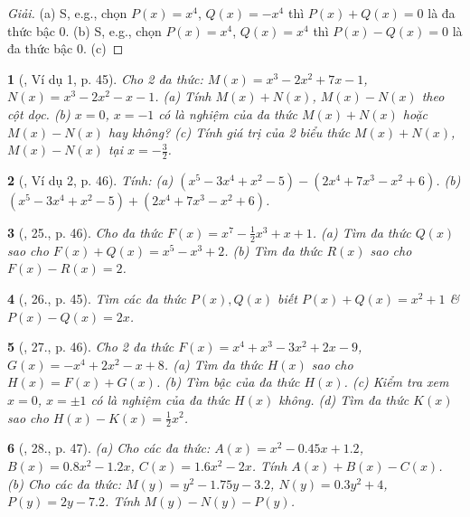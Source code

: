 \documentclass{article}
\newtheorem{baitoan}{}
\begin{document}
\begin{proof}[Giải]
	(a) S, e.g., chọn $P(x) = x^4$, $Q(x) = -x^4$ thì $P(x) + Q(x) = 0$ là đa thức bậc 0. (b) S, e.g., chọn $P(x) = x^4$, $Q(x) = x^4$ thì $P(x) - Q(x) = 0$ là đa thức bậc 0. (c)
\end{proof}

\begin{baitoan}[\cite{SBT_Toan_7_Canh_Dieu_tap_2}, Ví dụ 1, p. 45]
	Cho 2 đa thức: $M(x) =  x^3 - 2x^2 + 7x - 1$, $N(x) = x^3 - 2x^2 - x - 1$. (a) Tính $M(x) + N(x)$, $M(x) - N(x)$ theo cột dọc. (b) $x = 0$, $x = -1$ có là nghiệm của đa thức $M(x) + N(x)$ hoặc $M(x) - N(x)$ hay không? (c) Tính giá trị của 2 biểu thức $M(x) + N(x)$, $M(x) - N(x)$ tại $x = -\frac{3}{2}$.
\end{baitoan}

\begin{baitoan}[\cite{SBT_Toan_7_Canh_Dieu_tap_2}, Ví dụ 2, p. 46]
	Tính: (a) $(x^5 - 3x^4 + x^2 - 5) - (2x^4 + 7x^3 - x^2 + 6)$. (b) $(x^5 - 3x^4 + x^2 - 5) + (2x^4 + 7x^3 - x^2 + 6)$.
\end{baitoan}

\begin{baitoan}[\cite{SBT_Toan_7_Canh_Dieu_tap_2}, 25., p. 46]
	Cho đa thức $F(x) = x^7 - \frac{1}{2}x^3 + x + 1$. (a) Tìm đa thức $Q(x)$ sao cho $F(x) + Q(x) = x^5 - x^3 + 2$. (b) Tìm đa thức $R(x)$ sao cho $F(x) - R(x) = 2$.
\end{baitoan}

\begin{baitoan}[\cite{SBT_Toan_7_Canh_Dieu_tap_2}, 26., p. 45]
	Tìm các đa thức $P(x),Q(x)$ biết $P(x) + Q(x) = x^2 + 1$ \& $P(x) - Q(x) = 2x$.
\end{baitoan}

\begin{baitoan}[\cite{SBT_Toan_7_Canh_Dieu_tap_2}, 27., p. 46]
	Cho 2 đa thức $F(x) = x^4 + x^3 - 3x^2 + 2x - 9$, $G(x) = -x^4 + 2x^2 - x + 8$. (a) Tìm đa thức $H(x)$ sao cho $H(x) = F(x) + G(x)$. (b) Tìm bậc của đa thức $H(x)$. (c) Kiểm tra xem $x = 0$, $x = \pm1$ có là nghiệm của đa thức $H(x)$ không. (d) Tìm đa thức $K(x)$ sao cho $H(x) - K(x) = \frac{1}{2}x^2$.
\end{baitoan}

\begin{baitoan}[\cite{SBT_Toan_7_Canh_Dieu_tap_2}, 28., p. 47]
	(a) Cho các đa thức: $A(x) = x^2 - 0.45x + 1.2$, $B(x) = 0.8x^2 - 1.2x$, $C(x) = 1.6x^2 - 2x$. Tính $A(x) + B(x) - C(x)$. (b) Cho các đa thức: $M(y) = y^2 - 1.75y - 3.2$, $N(y) = 0.3y^2 + 4$, $P(y) = 2y - 7.2$. Tính $M(y) - N(y) - P(y)$.
\end{baitoan}
\end{document}
